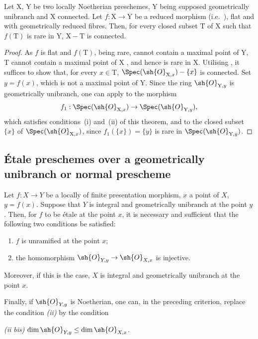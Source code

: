 \begin{corollary}[18.9.11]
\label{IV.18.9.11}
Let $\mathrm{X}$, $\mathrm{Y}$ be two locally Noetherian preschemes, $\mathrm{Y}$ being supposed geometrically unibranch and X connected.
Let $f:\mathrm{X}\to\mathrm{Y}$ be a reduced morphism (i.e.~), flat and with geometrically reduced fibres.
Then, for every closed subset $\mathrm{T}$ of $\mathrm{X}$ such that $f(\mathrm{T})$ is rare in $\mathrm{Y}$, $\mathrm{X}-\mathrm{T}$ is connected.
\end{corollary}

\begin{proof}
As $f$ is flat and $f(\mathrm{T})$, being rare, cannot contain a maximal point of Y, T cannot contain a maximal point of X , and hence is rare in X.
Utilising , it suffices to show that, for every $x\in\mathrm{T}$, $\Spec(\sh{O}_{\mathrm{X},x})-\{x\}$ is connected.
Set $y=f(x)$, which is not a maximal point of Y.
Since the ring $\sh{O}_{\mathrm{Y},y}$ is geometrically unibranch, one can apply  to the morphism
\[
  f_1:\Spec(\sh{O}_{\mathrm{X},x})\to\Spec(\sh{O}_{\mathrm{Y},y}),
\]
which satisfies conditions~(i) and~(ii) of this theorem, and to the closed subset $\{x\}$ of $\Spec(\sh{O}_{\mathrm{X},x})$, since $f_1(\{x\})=\{y\}$ is rare in $\Spec(\sh{O}_{\mathrm{Y},y})$.
\end{proof}
\subsection{\'Etale preschemes over a geometrically unibranch or normal prescheme}
\label{subsection:IV.18.10}

\begin{theorem}[18.10.1]
\label{IV.18.10.1}
Let $f:X\to Y$ be a locally of finite presentation morphism, $x$ a point of $X$, $y=f(x)$.
Suppose that $Y$ is integral and geometrically unibranch at the point $y$.
Then, for $f$ to be \'etale at the point $x$, it is necessary and sufficient that the following two conditions be satisfied:
\begin{enumerate}[label=\emph{\roman*)}]
  \item $f$ is unramified at the point $x$;
  \item the homomorphism $\sh{O}_{Y,y}\to\sh{O}_{X,x}$ is injective.
\end{enumerate}

Moreover, if this is the case, $X$ is integral and geometrically unibranch at the point $x$.

Finally, if $\sh{O}_{Y,y}$ is Noetherian, one can, in the preceding criterion, replace the condition \emph{(ii)} by the condition

\emph{(ii bis)} $\dim\sh{O}_{Y,y}\leq\dim\sh{O}_{X,x}$.
\end{theorem}

